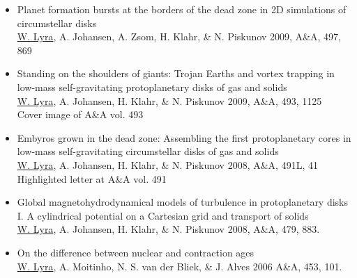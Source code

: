\documentclass{article}
\begin{document}
\begin{itemize}
    
\item{Planet formation bursts at the borders of the dead zone in 2D simulations of circumstellar disks\\
\underline{W. Lyra}, A. Johansen, A. Zsom, H. Klahr, \& N. Piskunov 2009, A\&A, 497, 869}

\item{Standing on the shoulders of giants: Trojan Earths and vortex trapping in low-mass self-gravitating protoplanetary disks of gas and solids\\
\underline{W. Lyra}, A. Johansen, H. Klahr, \& N. Piskunov 2009, A\&A, 493, 1125\\
Cover image of A\&A vol. 493}

\item{Embyros grown in the dead zone: Assembling the first protoplanetary cores in low-mass self-gravitating circumstellar disks of gas and solids\\
\underline{W. Lyra}, A. Johansen, H. Klahr, \& N. Piskunov 2008, A\&A, 491L, 41\\
Highlighted letter at A\&A vol. 491}

\item{Global magnetohydrodynamical models of turbulence in protoplanetary disks\\
I. A cylindrical potential on a Cartesian grid and transport of solids\\
\underline{W. Lyra}, A. Johansen, H. Klahr, \& N. Piskunov 2008, A\&A, 479, 883.}

\item{On the difference between nuclear and contraction ages\\
\underline{W. Lyra}, A. Moitinho, N. S. van der Bliek, \& J. Alves 2006 A\&A, 453, 101.}

\end{itemize} 
\end{document}

